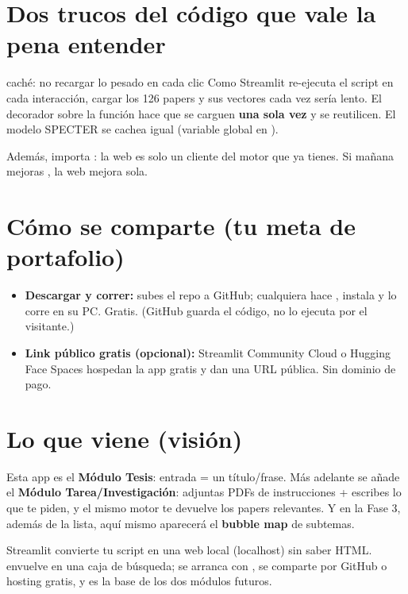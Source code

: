 \documentclass[11pt,a4paper]{article}
\begin{document}
\section{Dos trucos del código que vale la pena entender}

\begin{concepto}{caché: no recargar lo pesado en cada clic}
Como Streamlit re-ejecuta el script en cada interacción, cargar los 126 papers y sus vectores
cada vez sería lento. El decorador  sobre la función
 hace que se carguen \textbf{una sola vez} y se reutilicen. El modelo
SPECTER se cachea igual (variable global en ).
\end{concepto}

Además,  importa : la web es solo un
cliente del motor que ya tienes. Si mañana mejoras , la web mejora sola.

\section{Cómo se comparte (tu meta de portafolio)}

\begin{itemize}
  \item \textbf{Descargar y correr:} subes el repo a GitHub; cualquiera hace ,
        instala  y lo corre en su PC. Gratis. (GitHub guarda el código,
        no lo ejecuta por el visitante.)
  \item \textbf{Link público gratis (opcional):} Streamlit Community Cloud o Hugging Face Spaces
        hospedan la app gratis y dan una URL pública. Sin dominio de pago.
\end{itemize}

\section{Lo que viene (visión)}

Esta app es el \textbf{Módulo Tesis}: entrada = un título/frase. Más adelante se añade el
\textbf{Módulo Tarea/Investigación}: adjuntas PDFs de instrucciones + escribes lo que te piden,
y el mismo motor te devuelve los papers relevantes. Y en la Fase 3, además de la lista, aquí
mismo aparecerá el \textbf{bubble map} de subtemas.

\begin{resumen}
Streamlit convierte tu script en una web local (localhost) sin saber HTML. 
envuelve  en una caja de búsqueda; se arranca con , se comparte por GitHub o hosting gratis, y es la base de los dos módulos futuros.
\end{resumen}
\end{document}
